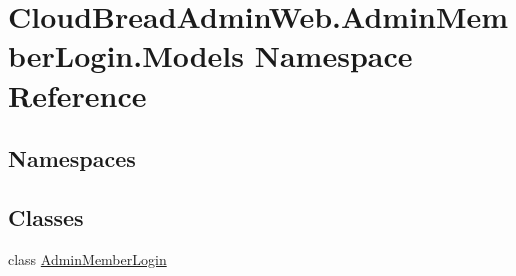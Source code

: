 \hypertarget{a00416}{}\section{Cloud\+Bread\+Admin\+Web.\+Admin\+Member\+Login.\+Models Namespace Reference}
\label{a00416}
\subsection*{Namespaces}
\begin{DoxyCompactItemize}
\end{DoxyCompactItemize}
\subsection*{Classes}
\begin{DoxyCompactItemize}
\item 
class \hyperlink{a00010}{Admin\+Member\+Login}
\end{DoxyCompactItemize}
